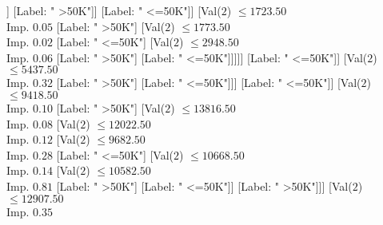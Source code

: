 \documentclass[margin=10pt]{standalone}
\begin{document}
\begin{forest}
											[Val($10$) $ \leq 35.50$ \\ Imp. $0.06$
												[Val($2$) $ \leq 17904.50$ \\ Imp. $0.04$
													[Val($2$) $ \leq 6634.50$ \\ Imp. $0.04$
														[Val($2$) $ \leq 5619.50$ \\ Imp. $0.05$
															[Val($2$) $ \leq 4886.50$ \\ Imp. $0.03$
																[Val($2$) $ \leq 3632.50$ \\ Imp. $0.03$
																	[Val($2$) $ \leq 1398.50$ \\ Imp. $0.02$
																		[Val($2$) $ \leq 1349.50$ \\ Imp. $0.11$
																			[Val($2$) $ \leq 1321.50$ \\ Imp. $0.08$
																				[Val($2$) $ \leq 999.50$ \\ Imp. $0.07$
																					[Label: " >50K"]
																					[Label: " <=50K"]]
																				[Label: " >50K"]]
																			[Label: " <=50K"]]
																		[Val($2$) $ \leq 1723.50$ \\ Imp. $0.05$
																			[Label: " >50K"]
																			[Val($2$) $ \leq 1773.50$ \\ Imp. $0.02$
																				[Label: " <=50K"]
																				[Val($2$) $ \leq 2948.50$ \\ Imp. $0.06$
																					[Label: " >50K"]
																					[Label: " <=50K"]]]]]
																	[Label: " <=50K"]]
																[Val($2$) $ \leq 5437.50$ \\ Imp. $0.32$
																	[Label: " >50K"]
																	[Label: " <=50K"]]]
															[Label: " <=50K"]]
														[Val($2$) $ \leq 9418.50$ \\ Imp. $0.10$
															[Label: " >50K"]
															[Val($2$) $ \leq 13816.50$ \\ Imp. $0.08$
																[Val($2$) $ \leq 12022.50$ \\ Imp. $0.12$
																	[Val($2$) $ \leq 9682.50$ \\ Imp. $0.28$
																		[Label: " <=50K"]
																		[Val($2$) $ \leq 10668.50$ \\ Imp. $0.14$
																			[Val($2$) $ \leq 10582.50$ \\ Imp. $0.81$
																				[Label: " >50K"]
																				[Label: " <=50K"]]
																			[Label: " >50K"]]]
																	[Val($2$) $ \leq 12907.50$ \\ Imp. $0.35$

\end{forest}
\end{document}
